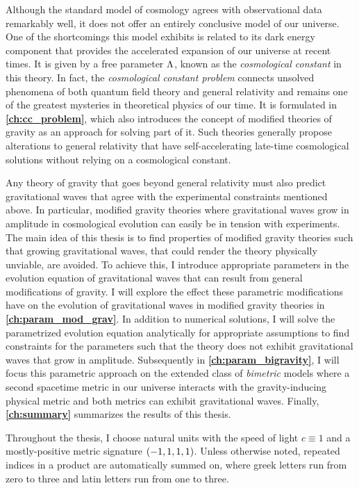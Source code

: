 Although the \LCDM{} standard model of cosmology agrees with observational data remarkably well, it does not offer an entirely conclusive model of our universe. One of the shortcomings this model exhibits is related to its dark energy component that provides the accelerated expansion of our universe at recent times. It is given by a free parameter \(\Lambda\), known as the \emph{cosmological constant} in this theory. In fact, the \emph{cosmological constant problem} connects unsolved phenomena of both quantum field theory and general relativity and remains one of the greatest mysteries in theoretical physics of our time. It is formulated in \textbf{\autoref{ch:cc_problem}}, which also introduces the concept of modified theories of gravity as an approach for solving part of it. Such theories generally propose alterations to general relativity that have self-accelerating late-time cosmological solutions without relying on a cosmological constant.

Any theory of gravity that goes beyond general relativity must also predict gravitational waves that agree with the experimental constraints mentioned above. In particular, modified gravity theories where gravitational waves grow in amplitude in cosmological evolution can easily be in tension with experiments. The main idea of this thesis is to find properties of modified gravity theories such that growing gravitational waves, that could render the theory physically unviable, are avoided. To achieve this, I introduce appropriate parameters in the evolution equation of gravitational waves that can result from general modifications of gravity. I will explore the effect these parametric modifications have on the evolution of gravitational waves in modified gravity theories in \textbf{\autoref{ch:param_mod_grav}}. In addition to numerical solutions, I will solve the parametrized evolution equation analytically for appropriate assumptions to find constraints for the parameters such that the theory does not exhibit gravitational waves that grow in amplitude. Subsequently in \textbf{\autoref{ch:param_bigravity}}, I will focus this parametric approach on the extended class of \emph{bimetric} models where a second spacetime metric in our universe interacts with the gravity-inducing physical metric and both metrics can exhibit gravitational waves. Finally, \textbf{\autoref{ch:summary}} summarizes the results of this thesis.

Throughout the thesis, I choose natural units with the speed of light \(c \equiv 1\) and a mostly-positive metric signature \(\del{-1,1,1,1}\). Unless otherwise noted, repeated indices in a product are automatically summed on, where greek letters run from zero to three and latin letters run from one to three.


